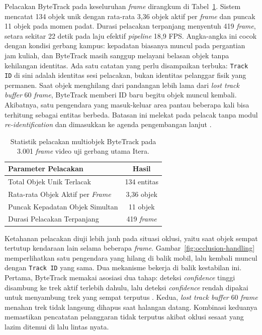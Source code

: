 Pelacakan ByteTrack pada keseluruhan \textit{frame} dirangkum di Tabel~\ref{tab:bytetrack-basic-stats}. Sistem mencatat 134 objek unik dengan rata-rata 3,36 objek aktif per \textit{frame} dan puncak 11 objek pada momen padat. Durasi pelacakan terpanjang menyentuh 419 \textit{frame}, setara sekitar 22 detik pada laju efektif \textit{pipeline} 18,9 FPS. Angka-angka ini cocok dengan kondisi gerbang kampus: kepadatan biasanya muncul pada pergantian jam kuliah, dan ByteTrack masih sanggup melayani belasan objek tanpa kehilangan identitas. Ada satu catatan yang perlu disampaikan terbuka: \texttt{Track ID} di sini adalah identitas sesi pelacakan, bukan identitas pelanggar fisik yang permanen. Saat objek menghilang dari pandangan lebih lama dari \textit{lost track buffer} 60 \textit{frame}, ByteTrack memberi ID baru begitu objek muncul kembali. Akibatnya, satu pengendara yang masuk-keluar area pantau beberapa kali bisa terhitung sebagai entitas berbeda. Batasan ini melekat pada pelacak tanpa modul \textit{re-identification} dan dimasukkan ke agenda pengembangan lanjut \cite{zhang2022bytetrack_eccv}.

\begin{table}[htbp]
\centering
\caption{Statistik pelacakan multiobjek ByteTrack pada 3.001 \textit{frame} video uji gerbang utama Itera.}
\label{tab:bytetrack-basic-stats}
\begin{tabular}{lc}
\toprule
\textbf{Parameter Pelacakan} & \textbf{Hasil} \\
\midrule
Total Objek Unik Terlacak & 134 entitas \\
Rata-rata Objek Aktif per \textit{Frame} & 3,36 objek \\
Puncak Kepadatan Objek Simultan & 11 objek \\
Durasi Pelacakan Terpanjang & 419 \textit{frame} \\
\bottomrule
\end{tabular}
\end{table}

Ketahanan pelacakan diuji lebih jauh pada situasi oklusi, yaitu saat objek sempat tertutup kendaraan lain selama beberapa \textit{frame}. Gambar~\ref{fig:occlusion-handling} memperlihatkan satu pengendara yang hilang di balik mobil, lalu kembali muncul dengan \texttt{Track ID} yang sama. Dua mekanisme bekerja di balik kestabilan ini. Pertama, ByteTrack memakai asosiasi dua tahap: deteksi \textit{confidence} tinggi disambung ke trek aktif terlebih dahulu, lalu deteksi \textit{confidence} rendah dipakai untuk menyambung trek yang sempat terputus \cite{ma2023adaptivebytetrack}. Kedua, \textit{lost track buffer} 60 \textit{frame} menahan trek tidak langsung dihapus saat halangan datang. Kombinasi keduanya memastikan pencatatan pelanggaran tidak terputus akibat oklusi sesaat yang lazim ditemui di lalu lintas nyata.

